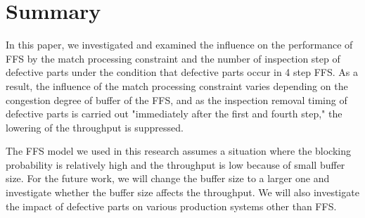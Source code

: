 
%

\section{Summary}
In this paper, we investigated and examined the influence on the performance of FFS by the match processing constraint and the number of inspection step of defective parts under the condition that defective parts occur in 4 step FFS.
As a result, the influence of the match processing constraint varies depending on the congestion degree of buffer of the FFS, and as the inspection removal timing of defective parts is carried out "immediately after the first and fourth step," the lowering of the throughput is suppressed.

The FFS model we used in this research assumes a situation where the blocking probability is relatively high and the throughput is low because of small buffer size.
For the future work, we will change the buffer size to a larger one and investigate whether the buffer size affects the throughput.
We will also investigate the impact of defective parts on various production systems other than FFS.
